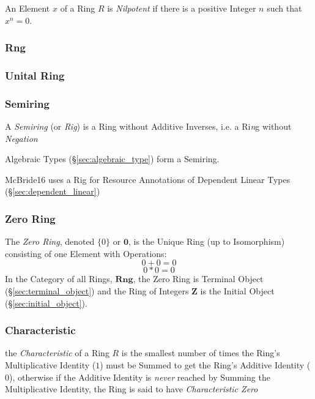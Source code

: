 An Element $x$ of a Ring $R$ is \emph{Nilpotent} if there is a
positive Integer $n$ such that $x^n = 0$.



\subsubsection{Rng}\label{sec:rng}

\subsubsection{Unital Ring}\label{sec:unital_ring}

\subsubsection{Semiring}\label{sec:semiring}

A \emph{Semiring} (or \emph{Rig}) is a Ring without Additive Inverses,
i.e. a Ri\emph{n}g without \emph{Negation}

Algebraic Types (\S\ref{sec:algebraic_type}) form a Semiring.

McBride16 uses a Rig for Resource Annotations of Dependent Linear
Types (\S\ref{sec:dependent_linear})



\subsubsection{Zero Ring}\label{sec:zero_ring}

The \emph{Zero Ring}, denoted $\{0\}$ or $\mathbf{0}$, is the Unique Ring
(up to Isomorphism) consisting of one Element with Operations:
\[
    0 + 0 = 0
\] \[
    0 * 0 = 0
\]
In the Category of all Rings, $\mathbf{Rng}$, the Zero Ring is
Terminal Object (\S\ref{sec:terminal_object}) and the Ring of Integers
$\mathbf{Z}$ is the Initial Object (\S\ref{sec:initial_object}).



\subsubsection{Characteristic}\label{sec:ring_characteristic}

the \emph{Characteristic} of a Ring $R$ is the smallest number of times the
Ring's Multiplicative Identity ($1$) must be Summed to get the Ring's Additive
Identity ($0$), otherwise if the Additive Identity is \emph{never} reached by
Summing the Multiplicative Identity, the Ring is said to have
\emph{Characteristic Zero}

